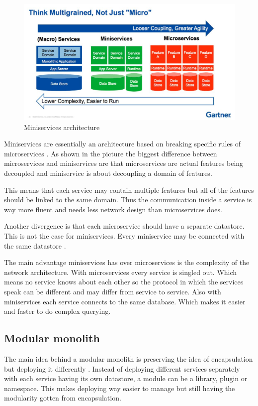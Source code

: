\begin{figure}[H]
	\includegraphics[width=\linewidth]{miniservices.png}
	\caption{Miniservices architecture \cite{miniservicesDefinition}}
\end{figure}

Miniservices are essentially an architecture based on breaking specific rules of microservices \cite{miniservicesOrigin}. As shown in the picture the biggest difference between microservices and miniservices are that microservices are actual features being decoupled and miniservice is about decoupling a domain of features.

This means that each service may contain multiple features but all of the features should be linked to the same domain. Thus the communication inside a service is way more fluent and needs less network design than microservices does.

Another divergence is that each microservice should have a separate datastore. This is not the case for miniservices. Every miniservice may be connected with the same datastore \cite{miniservicesDefinition}.

The main advantage miniservices has over microservices is the complexity of the network architecture. With microservices every service is singled out. Which means no service knows about each other so the protocol in which the services speak can be different and may differ from service to service. Also with miniservices each service connects to the same database. Which makes it easier and faster to do complex querying.

\subsection{Modular monolith}
\label{sec:ModularMonolith}

The main idea behind a modular monolith is preserving the idea of encapsulation but deploying it differently \cite{modularMonolithIdea}. Instead of deploying different services separately with each service having its own datastore, a module can be a library, plugin or namespace. This makes deploying way easier to manage but still having the modularity gotten from encapsulation.

